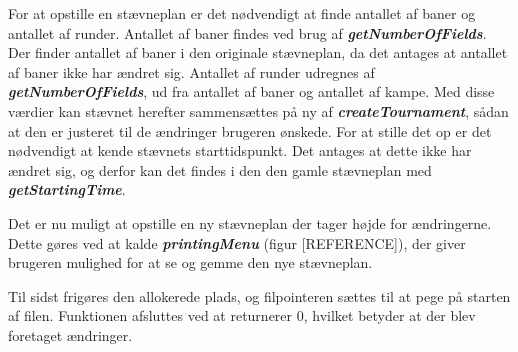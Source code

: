 \par
For at opstille en stævneplan er det nødvendigt at finde antallet af baner og antallet af runder. Antallet af baner findes ved brug af \textbf{\textit{getNumberOfFields}}. Der finder antallet af baner i den originale stævneplan, da det antages at antallet af baner ikke har ændret sig.
Antallet af runder udregnes af \textbf{\textit{getNumberOfFields}}, ud fra antallet af baner og antallet af kampe. 
Med disse værdier kan stævnet herefter sammensættes på ny af \textbf{\textit{createTournament}}, sådan at den er justeret til de ændringer brugeren ønskede.
For at stille det op er det nødvendigt at kende stævnets starttidspunkt.
Det antages at dette ikke har ændret sig, og derfor kan det findes i den den gamle stævneplan med \textbf{\textit{getStartingTime}}.
\par
Det er nu muligt at opstille en ny stævneplan der tager højde for ændringerne. Dette gøres ved at kalde \textbf{\textit{printingMenu}} (figur [REFERENCE]), der giver brugeren mulighed for at se og gemme den nye stævneplan.
\par
Til sidst frigøres den allokerede plads, og filpointeren sættes til at pege på starten af filen. Funktionen afsluttes ved at returnerer 0, hvilket betyder at der blev foretaget ændringer. 
